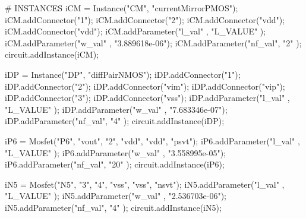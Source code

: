 \begin{DoxyCodeInclude}
\textcolor{comment}{# INSTANCES}
iCM = Instance(\textcolor{stringliteral}{"CM"}, \textcolor{stringliteral}{"currentMirrorPMOS"});
iCM.addConnector(\textcolor{stringliteral}{"1"});
iCM.addConnector(\textcolor{stringliteral}{"2"});
iCM.addConnector(\textcolor{stringliteral}{"vdd"});
iCM.addConnector(\textcolor{stringliteral}{"vdd"});
iCM.addParameter(\textcolor{stringliteral}{"l\_val"} , \textcolor{stringliteral}{"L\_VALUE"}     );
iCM.addParameter(\textcolor{stringliteral}{"w\_val"} , \textcolor{stringliteral}{"3.889618e-06"});
iCM.addParameter(\textcolor{stringliteral}{"nf\_val"}, \textcolor{stringliteral}{"2"}           );
circuit.addInstance(iCM);

iDP = Instance(\textcolor{stringliteral}{"DP"}, \textcolor{stringliteral}{"diffPairNMOS"});
iDP.addConnector(\textcolor{stringliteral}{"1"});
iDP.addConnector(\textcolor{stringliteral}{"2"});
iDP.addConnector(\textcolor{stringliteral}{"vim"});
iDP.addConnector(\textcolor{stringliteral}{"vip"});
iDP.addConnector(\textcolor{stringliteral}{"3"});
iDP.addConnector(\textcolor{stringliteral}{"vss"});
iDP.addParameter(\textcolor{stringliteral}{"l\_val"} , \textcolor{stringliteral}{"L\_VALUE"}     );
iDP.addParameter(\textcolor{stringliteral}{"w\_val"} , \textcolor{stringliteral}{"7.683346e-07"});
iDP.addParameter(\textcolor{stringliteral}{"nf\_val"}, \textcolor{stringliteral}{"4"}           );
circuit.addInstance(iDP);

iP6 = Mosfet(\textcolor{stringliteral}{"P6"}, \textcolor{stringliteral}{"vout"}, \textcolor{stringliteral}{"2"}, \textcolor{stringliteral}{"vdd"}, \textcolor{stringliteral}{"vdd"}, \textcolor{stringliteral}{"psvt"});
iP6.addParameter(\textcolor{stringliteral}{"l\_val"} , \textcolor{stringliteral}{"L\_VALUE"}     );
iP6.addParameter(\textcolor{stringliteral}{"w\_val"} , \textcolor{stringliteral}{"3.558995e-05"});
iP6.addParameter(\textcolor{stringliteral}{"nf\_val"}, \textcolor{stringliteral}{"20"}          );
circuit.addInstance(iP6);

iN5 = Mosfet(\textcolor{stringliteral}{"N5"}, \textcolor{stringliteral}{"3"}, \textcolor{stringliteral}{"4"}, \textcolor{stringliteral}{"vss"}, \textcolor{stringliteral}{"vss"}, \textcolor{stringliteral}{"nsvt"});
iN5.addParameter(\textcolor{stringliteral}{"l\_val"} , \textcolor{stringliteral}{"L\_VALUE"}     );
iN5.addParameter(\textcolor{stringliteral}{"w\_val"} , \textcolor{stringliteral}{"2.536703e-06"});
iN5.addParameter(\textcolor{stringliteral}{"nf\_val"}, \textcolor{stringliteral}{"4"}           );
circuit.addInstance(iN5);


\end{DoxyCodeInclude}
